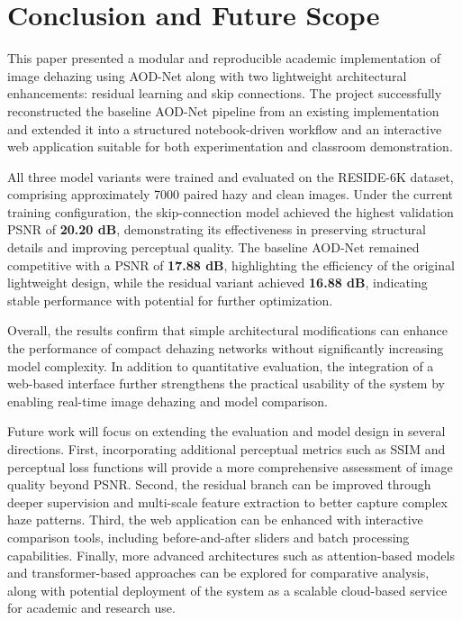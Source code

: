 \documentclass[conference]{IEEEtran}
\begin{document}
\section{Conclusion and Future Scope}

This paper presented a modular and reproducible academic implementation of image dehazing using AOD-Net along with two lightweight architectural enhancements: residual learning and skip connections. The project successfully reconstructed the baseline AOD-Net pipeline from an existing implementation and extended it into a structured notebook-driven workflow and an interactive web application suitable for both experimentation and classroom demonstration.

All three model variants were trained and evaluated on the RESIDE-6K dataset, comprising approximately 7000 paired hazy and clean images. Under the current training configuration, the skip-connection model achieved the highest validation PSNR of \textbf{20.20 dB}, demonstrating its effectiveness in preserving structural details and improving perceptual quality. The baseline AOD-Net remained competitive with a PSNR of \textbf{17.88 dB}, highlighting the efficiency of the original lightweight design, while the residual variant achieved \textbf{16.88 dB}, indicating stable performance with potential for further optimization.

Overall, the results confirm that simple architectural modifications can enhance the performance of compact dehazing networks without significantly increasing model complexity. In addition to quantitative evaluation, the integration of a web-based interface further strengthens the practical usability of the system by enabling real-time image dehazing and model comparison.

Future work will focus on extending the evaluation and model design in several directions. First, incorporating additional perceptual metrics such as SSIM and perceptual loss functions will provide a more comprehensive assessment of image quality beyond PSNR. Second, the residual branch can be improved through deeper supervision and multi-scale feature extraction to better capture complex haze patterns. Third, the web application can be enhanced with interactive comparison tools, including before-and-after sliders and batch processing capabilities. Finally, more advanced architectures such as attention-based models and transformer-based approaches can be explored for comparative analysis, along with potential deployment of the system as a scalable cloud-based service for academic and research use.
\end{document}
